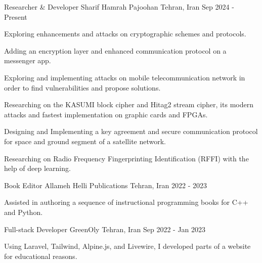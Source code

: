 \vspace{-10pt}
\vspace{-5pt}
\begin{cventries}
    \cventry
    {Researcher \& Developer}
    {Sharif Hamrah Pajoohan}
    {Tehran, Iran}
    {Sep 2024 - Present}
    {
        \begin{cvitems}
            \item {Exploring enhancements and attacks on cryptographic schemes and protocols.}
            \item {Adding an encryption layer and enhanced communication protocol on a messenger app.}
            \item {Exploring and implementing attacks on mobile telecommunication network in order to find vulnerabilities and propose solutions.}
            \item {Researching on the KASUMI block cipher and Hitag2 stream cipher, its modern attacks and fastest implementation on graphic cards and FPGAs.}
            \item {Designing and Implementing a key agreement and secure communication protocol for space and ground segment of a satellite network.}
            \item {Researching on Radio Frequency Fingerprinting Identification (RFFI) with the help of deep learning.}
        \end{cvitems}
    }

    \cventry
    {Book Editor}
    {Allameh Helli Publications}
    {Tehran, Iran}
    {2022 - 2023}
    {
        \begin{cvitems}
            \item {Assisted in authoring a sequence of instructional programming books for C++ and Python.}
        \end{cvitems}
    }

    \cventry
    {Full-stack Developer}
    {GreenOly}
    {Tehran, Iran}
    {Sep 2022 - Jan 2023}
    {
        \begin{cvitems}
            \item {Using Laravel, Tailwind, Alpine.js, and Livewire, I developed parts of a website for educational reasons.}
        \end{cvitems}
    }
\end{cventries}
